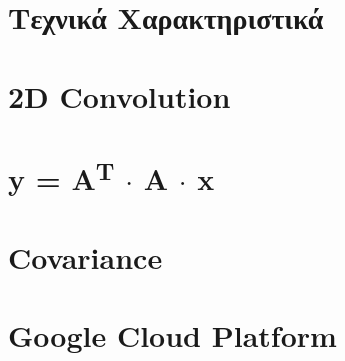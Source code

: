 \documentclass[a4paper,oneside,titlepage,10pt]{article}
\begin{document}


\newpage

\lstset{basicstyle=\large,style=myCustomMatlabStyle}
\color{black}

\setlength{\parskip}{10pt}
 \pagecolor{white} 
 
 \tableofcontents
\newpage
 
\setcounter{section}{-1}
 
\section{Τεχνικά Χαρακτηριστικά}


\newpage

\section{2D Convolution}


\section{y = A\textsuperscript{T} {$\cdot$} A {$\cdot$} x}


\section{Covariance}


\newpage

\section{Google Cloud Platform}


\newpage

 

\end{document}
